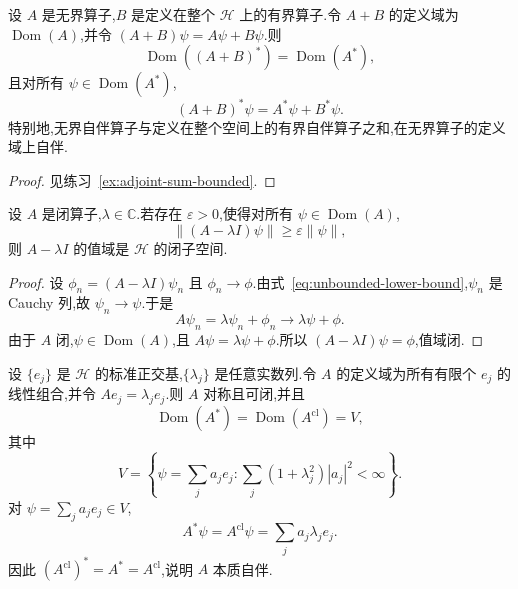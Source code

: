 \begin{proposition}[加有界算子后的伴随]\label{prop:adjoint-bounded-perturbation}
设 \(A\) 是无界算子,\(B\) 是定义在整个 \(\mathcal{H}\) 上的有界算子.令 \(A+B\) 的定义域为 \(\operatorname{Dom}(A)\),并令 \((A+B)\psi=A\psi+B\psi\).则
\[
\operatorname{Dom}((A+B)^{*})=\operatorname{Dom}(A^{*}),
\]
且对所有 \(\psi\in\operatorname{Dom}(A^{*})\),
\[
(A+B)^{*}\psi=A^{*}\psi+B^{*}\psi.
\]
特别地,无界自伴算子与定义在整个空间上的有界自伴算子之和,在无界算子的定义域上自伴.
\end{proposition}

\begin{proof}
见练习~\ref{ex:adjoint-sum-bounded}.
\end{proof}

\begin{proposition}[下界估计与闭值域]\label{prop:closed-range-unbounded}
设 \(A\) 是闭算子,\(\lambda\in\mathbb{C}\).若存在 \(\varepsilon>0\),使得对所有 \(\psi\in\operatorname{Dom}(A)\),
\[
\|(A-\lambda I)\psi\|\geq\varepsilon\|\psi\|,
\label{eq:unbounded-lower-bound}
\]
则 \(A-\lambda I\) 的值域是 \(\mathcal{H}\) 的闭子空间.
\end{proposition}

\begin{proof}
设 \(\phi_{n}=(A-\lambda I)\psi_{n}\) 且 \(\phi_{n}\to\phi\).由式~\eqref{eq:unbounded-lower-bound},\(\psi_{n}\) 是 Cauchy 列,故 \(\psi_{n}\to\psi\).于是
\[
A\psi_{n}=\lambda\psi_{n}+\phi_{n}\to\lambda\psi+\phi.
\]
由于 \(A\) 闭,\(\psi\in\operatorname{Dom}(A)\),且 \(A\psi=\lambda\psi+\phi\).所以 \((A-\lambda I)\psi=\phi\),值域闭.
\end{proof}

\begin{example}[对角无界算子]\label{ex:diagonal-unbounded-operator}
设 \(\{e_{j}\}\) 是 \(\mathcal{H}\) 的标准正交基,\(\{\lambda_{j}\}\) 是任意实数列.令 \(A\) 的定义域为所有有限个 \(e_{j}\) 的线性组合,并令 \(Ae_{j}=\lambda_{j}e_{j}\).则 \(A\) 对称且可闭,并且
\[
\operatorname{Dom}(A^{*})=\operatorname{Dom}(A^{\mathrm{cl}})=V,
\]
其中
\[
V=\left\{\psi=\sum_{j}a_{j}e_{j}:\sum_{j}(1+\lambda_{j}^{2})|a_{j}|^{2}<\infty\right\}.
\label{eq:diagonal-domain}
\]
对 \(\psi=\sum_{j}a_{j}e_{j}\in V\),
\[
A^{*}\psi=A^{\mathrm{cl}}\psi=\sum_{j}a_{j}\lambda_{j}e_{j}.
\label{eq:diagonal-closure}
\]
因此 \((A^{\mathrm{cl}})^{*}=A^{*}=A^{\mathrm{cl}}\),说明 \(A\) 本质自伴.
\end{example}

